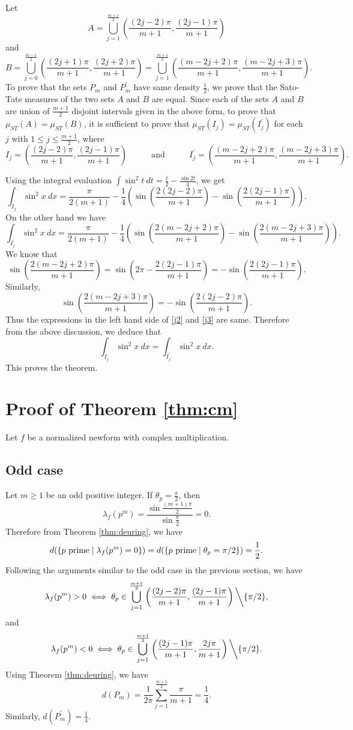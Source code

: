 \documentclass[12pt,a4paper,reqno]{amsart}
\begin{document}
Let 
$$
A= \bigcup_{j=1}^{\frac{m+1}{2}}\left(\frac{(2j-2)\pi}{m+1}, \frac{(2j-1)\pi}{m+1}\right)
$$
and
$$
B=\bigcup_{j=0}^{\frac{m-1}{2}}\left(\frac{(2j+1)\pi}{m+1}, \frac{(2j+2)\pi}{m+1}\right)
=\bigcup_{j=1}^{\frac{m+1}{2}}\left(\frac{(m-2j+2)\pi}{m+1}, \frac{(m-2j+3)\pi}{m+1}\right).
$$
To prove that the sets $P_m$ and $P_m^{'}$ have same density $\frac{1}{2}$, 
we prove that the Sato-Tate measures of the two sets $A$ and $B$ are equal. Since
each of the sets $A$ and $B$ are union of $\frac{m+1}{2}$ disjoint intervals given in 
the above form, to prove that $\mu_{ST}(A)=\mu_{ST}(B)$, it is sufficient to prove that 
$\mu_{ST}(I_j)=\mu_{ST}(I_j^{'})$ for each $j$ with $1\le j\le \frac{m+1}{2}$, where
$$
I_j=\left(\frac{(2j-2)\pi}{m+1}, \frac{(2j-1)\pi}{m+1}\right)~~~~~~~~~~~~~
\mbox{and}~~~~~~~~~~~~~I_j^{'}=\left(\frac{(m-2j+2)\pi}{m+1}, \frac{(m-2j+3)\pi}{m+1}\right).
$$

Using the integral evaluation $\int \sin^2 t \ dt= \frac{t}{2}-\frac{\sin 2t}{4}$, we get 
\begin{equation}\label{j2}
\int_{I_j}\sin^2x \ dx=\frac{\pi}{2(m+1)}-\frac{1}{4}
\left(\sin\left(\frac{2(2j-2)\pi}{m+1}\right)-\sin\left(\frac{2(2j-1)\pi}{m+1}\right)\right).
\end{equation}
On the other hand we have
\begin{equation}\label{j3}
\int_{I_j^{'}}\sin^2x \ dx=\frac{\pi}{2(m+1)}-\frac{1}{4}
\left(\sin\left(\frac{2(m-2j+2)\pi}{m+1}\right)-\sin\left(\frac{2(m-2j+3)\pi}{m+1}\right)\right).
\end{equation}
We know that
$$
\sin{\left(\frac{2(m-2j+2)\pi}{m+1}\right)}=\sin{\left(2\pi-\frac{2(2j-1)\pi}{m+1}\right)}
=-\sin{\left(\frac{2(2j-1)\pi}{m+1}\right)}.
$$
Similarly, 
$$\sin\left(\frac{2(m-2j+3)\pi}{m+1}\right)=-\sin\left(\frac{2(2j-2)\pi}{m+1}\right).$$
Thus the expressions in the left hand side of \eqref{j2} and \eqref{j3} are same.
Therefore from the above discussion, we deduce that
$$
\int_{I_j}\sin^2x \ dx=\int_{I_j^{'}}\sin^2x \ dx.
$$
This proves the theorem.
\section{Proof of Theorem \ref{thm:cm}}
Let $f$ be a normalized newform with complex multiplication.
\subsection{Odd case}
Let $m\ge1$ be an odd positive integer. If $\theta_p=\frac{\pi}{2}$, then
$$
\lambda_f(p^m)=\frac{\sin{\frac{(m+1)\pi}{2}}}{\sin{\frac{\pi}{2}}}=0.
$$
Therefore from Theorem \ref{thm:deuring}, we have
$$d(\{p \ {\rm prime} \mid \lambda_f(p^m)=0\})= d(\{p \ {\rm prime} \mid \theta_p=\pi/2\}) = \frac{1}{2}.$$ 
Following the arguments similar to the odd case in the previous section, we have 
$$
\lambda_f(p^m) > 0 \iff \theta_p \in 
\bigcup_{j=1}^{\frac{m+1}{2}}\left(\frac{(2j-2)\pi}{m+1}, \frac{(2j-1)\pi}{m+1}\right)
\bigg \backslash \{\pi /2\},
$$
and
$$
 \lambda_f(p^m)<0 \iff 
 \theta_p \in \bigcup_{j=1}^{\frac{m+1}{2}}\left(\frac{(2j-1)\pi}{m+1}, \frac{2j\pi}{m+1}\right)
\bigg \backslash \{\pi /2\}.
$$
Using Theorem \ref{thm:deuring}, we have
$$
d(P_m)=\frac{1}{2\pi}\sum_{j=1}^{\frac{m+1}{2}}\frac{\pi}{m+1}=\frac{1}{4}.
$$
Similarly, $d(P_m^{'})=\frac{1}{4}$.
\end{document}
